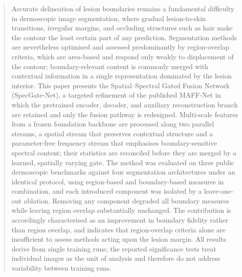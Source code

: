 \begin{abstract}
Accurate delineation of lesion boundaries remains a fundamental difficulty in dermoscopic image segmentation, where gradual lesion-to-skin transitions, irregular margins, and occluding structures such as hair make the contour the least certain part of any prediction. Segmentation methods are nevertheless optimised and assessed predominantly by region-overlap criteria, which are area-based and respond only weakly to displacement of the contour; boundary-relevant content is commonly merged with contextual information in a single representation dominated by the lesion interior. This paper presents the Spatial--Spectral Gated Fusion Network (SpecGate-Net), a targeted refinement of the published MAFF-Net in which the pretrained encoder, decoder, and auxiliary reconstruction branch are retained and only the fusion pathway is redesigned. Multi-scale features from a frozen foundation backbone are processed along two parallel streams, a spatial stream that preserves contextual structure and a parameter-free frequency stream that emphasises boundary-sensitive spectral content; their statistics are reconciled before they are merged by a learned, spatially varying gate. The method was evaluated on three public dermoscopic benchmarks against four segmentation architectures under an identical protocol, using region-based and boundary-based measures in combination, and each introduced component was isolated by a leave-one-out ablation. Removing any component degraded all boundary measures while leaving region overlap substantially unchanged. The contribution is accordingly characterised as an improvement in boundary fidelity rather than region overlap, and indicates that region-overlap criteria alone are insufficient to assess methods acting upon the lesion margin. All results derive from single training runs; the reported significance tests treat individual images as the unit of analysis and therefore do not address variability between training runs.
\end{abstract}
